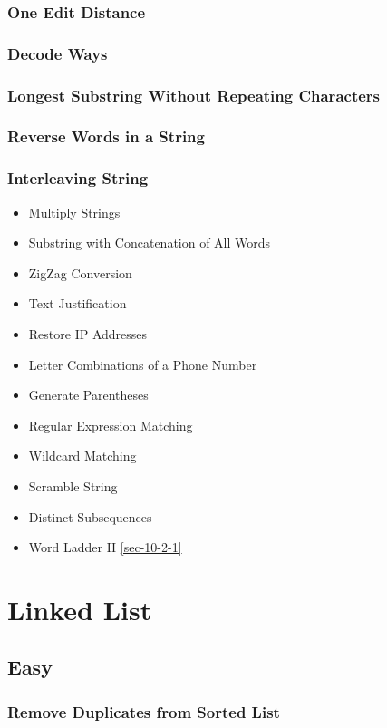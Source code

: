 \documentclass[12pt]{book}
\begin{document}
\subsection{One Edit Distance}
\label{sec-2-4-4}
\subsection{Decode Ways}
\label{sec-2-4-5}
\subsection{Longest Substring Without Repeating Characters}
\label{sec-2-4-6}
\subsection{Reverse Words in a String}
\label{sec-2-4-7}
\subsection{Interleaving String}
\label{sec-2-4-8}

\begin{itemize}
\item Multiply Strings
\item Substring with Concatenation of All Words
\item ZigZag Conversion
\item Text Justification
\item Restore IP Addresses

\item Letter Combinations of a Phone Number
\item Generate Parentheses
\item Regular Expression Matching
\item Wildcard Matching
\item Scramble String
\item Distinct Subsequences
\item Word Ladder II \ref{sec-10-2-1}
\end{itemize}
\chapter{Linked List}
\label{sec-3}
\section{Easy}
\label{sec-3-1}
\subsection{Remove Duplicates from Sorted List}
\label{sec-3-1-1}
\end{document}
